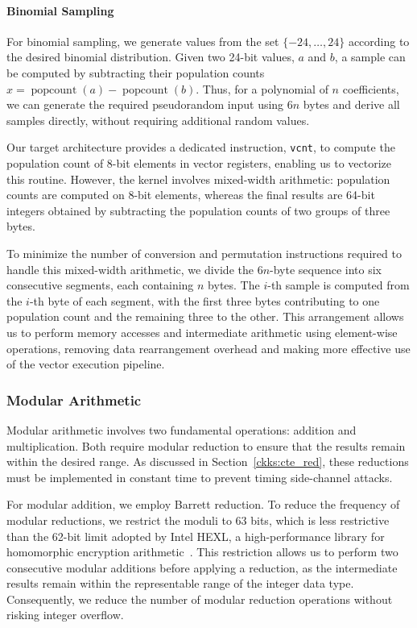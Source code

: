 \paragraph{Binomial Sampling}

For binomial sampling, we generate values from the set $\{-24, \ldots, 24\}$ according to the desired binomial distribution. Given two 24-bit values, $a$ and $b$, a sample can be computed by subtracting their population counts $x = \operatorname{popcount}(a) - \operatorname{popcount}(b)$. Thus, for a polynomial of $n$ coefficients, we can generate the required pseudorandom input using $6n$ bytes and derive all samples directly, without requiring additional random values.

Our target architecture provides a dedicated instruction, \texttt{vcnt}, to compute the population count of 8-bit elements in vector registers, enabling us to vectorize this routine. However, the kernel involves mixed-width arithmetic: population counts are computed on 8-bit elements, whereas the final results are 64-bit integers obtained by subtracting the population counts of two groups of three bytes.

To minimize the number of conversion and permutation instructions required to handle this mixed-width arithmetic, we divide the $6n$-byte sequence into six consecutive segments, each containing $n$ bytes. The $i$-th sample is computed from the $i$-th byte of each segment, with the first three bytes contributing to one population count and the remaining three to the other. This arrangement allows us to perform memory accesses and intermediate arithmetic using element-wise operations, removing data rearrangement overhead and making more effective use of the vector execution pipeline.

\subsubsection{Modular Arithmetic}

Modular arithmetic involves two fundamental operations: addition and multiplication. Both require modular reduction to ensure that the results remain within the desired range. As discussed in Section~\ref{ckks:cte_red}, these reductions must be implemented in constant time to prevent timing side-channel attacks.

For modular addition, we employ Barrett reduction. To reduce the frequency of modular reductions, we restrict the moduli to 63 bits, which is less restrictive than the 62-bit limit adopted by Intel HEXL, a high-performance library for homomorphic encryption arithmetic~\cite{boemer2021intel}. This restriction allows us to perform two consecutive modular additions before applying a reduction, as the intermediate results remain within the representable range of the integer data type. Consequently, we reduce the number of modular reduction operations without risking integer overflow.

